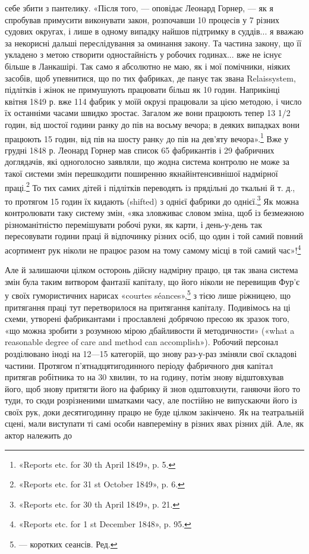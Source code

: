 \parcont{}  %
себе збити з пантелику. «Після того, — оповідає Леонард Горнер, —
як я спробував примусити виконувати закон, розпочавши 10 процесів
у 7 різних судових округах, і лише в одному випадку найшов
підтримку в суддів... я вважаю за некорисні дальші переслідування
за оминання закону. Та частина закону, що її укладено
з метою створити одностайність у робочих годинах... вже не існує
більше в Ланкашірі. Так само я абсолютно не маю, як і мої помічники,
ніяких засобів, щоб упевнитися, що по тих фабриках, де
панує так звана Relaissystem, підлітків і жінок не примушують
працювати більш як 10 годин. Наприкінці квітня 1849 р. вже
114 фабрик у моїй окрузі працювали за цією методою, і число
їх останніми часами швидко зростає. Загалом же вони працюють
тепер 13 1/2 годин, від шостої години ранку до пів на восьму вечора;
в деяких випадках вони працюють 15 годин, від пів на шосту
ранкy до пів на дев’яту вечора».\footnote{
«Reports etc. for 30 th April 1849», p. 5.
} Вже у грудні 1848 р. Леонард
Горнер мав список 65 фабрикантів і 29 фабричних доглядачів,
які одноголосно заявляли, що жодна система контролю не може
за такої системи змін перешкодити поширенню якнайінтенсивнішої
надмірної праці.\footnote{
«Reports etc. for 31 st October 1849», p. 6.
} То тих самих дітей і підлітків переводять
із прядільні до ткальні й т. д., то протягом 15 годин їх
кидають (shifted) з однієї фабрики до однієї.\footnote{
«Reports etc. for 30 th April 1849», p. 21.
} Як можна контролювати
таку систему змін, «яка зловживає словом зміна, щоб із
безмежною різноманітністю перемішувати робочі руки, як карти,
і день-у-день так пересовувати години праці й відпочинку
різних осіб, що один і той самий повний асортимент рук ніколи
не працює разом на тому самому місці в той самий час»!\footnote{
«Reports etc. for 1 st December 1848», p. 95.
}

Але й залишаючи цілком осторонь дійсну надмірну працю,
ця так звана система змін була таким витвором фантазії капіталу,
що його ніколи не перевищив Фур’є у своїх гумористичних
нарисах «courtes séances»,\footnote*{
— коротких сеансів. Ред.
} з тією лише ріжницею, що притягання
праці тут перетворилося на притягання капіталу. Подивімось
на ці схеми, утворені фабрикантами і прославлені добрячою
пресою як зразок того, «що можна зробити з розумною мірою
дбайливости й методичности» («what a reasonable degree of care
and method can accomplish»). Робочий персонал розділювано
іноді на 12—15 категорій, що знову раз-у-раз зміняли свої
складові частини. Протягом п’ятнадцятигодинного періоду фабричного
дня капітал притягав робітника то на 30 хвилин, то на
годину, потім знову відштовхував його, щоб знову притягти
його на фабрику й знов одштовхнути, ганяючи його то туди, то сюди
розрізненими шматками часу, але постійно не випускаючи його
із своїх рук, доки десятигодинну працю не буде цілком закінчено.
Як на театральній сцені, мали виступати ті самі особи навпереміну
в різних явах різних дій. Але, як актор належить до
\parbreak{}  %
